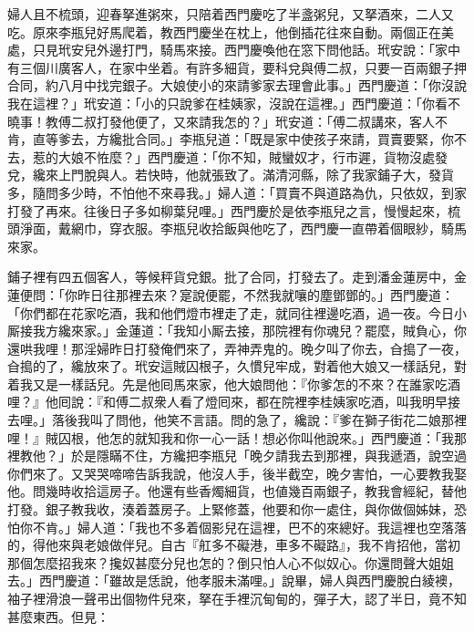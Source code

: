 婦人且不梳頭，迎春拏進粥來，只陪着西門慶吃了半盞粥兒，又拏酒來，二人又吃。原來李瓶兒好馬爬着，教西門慶坐在枕上，他倒插花往來自動。兩個正在美處，只見玳安兒外邊打門，騎馬來接。西門慶喚他在窓下問他話。玳安說：「家中有三個川廣客人，在家中坐着。有許多細貨，要科兌與傅二叔，只要一百兩銀子押合同，約八月中找完銀子。大娘使小的來請爹家去理會此事。」{}西門慶道：「你沒說我在這裡？」玳安道：「小的只說爹在桂姨家，沒說在這裡。」西門慶道：「你看不曉事！教傅二叔打發他便了，又來請我怎的？」玳安道：「傅二叔講來，客人不肯，直等爹去，方纔批合同。」李瓶兒道：「既是家中使孩子來請，買賣要緊，你不去，惹的大娘不恠麼？」西門慶道：「你不知，賊蠻奴才，行市遲，貨物沒處發兌，纔來上門脫與人。{}若快時，他就張致了。滿清河縣，除了我家鋪子大，發貨多，隨問多少時，不怕他不來尋我。」{}婦人道：「買賣不與道路為仇，{}只依奴，到家打發了再來。往後日子多如柳葉兒哩。」西門慶於是依李瓶兒之言，慢慢起來，梳頭淨面，戴網巾，穿衣服。李瓶兒收拾飯與他吃了，西門慶一直帶着個眼紗，騎馬來家。

鋪子裡有四五個客人，等候秤貨兌銀。批了合同，打發去了。走到潘金蓮房中，金蓮便問：「你昨日往那裡去來？寔說便罷，不然我就嚷的塵鄧鄧的。」西門慶道：「你們都在花家吃酒，我和他們燈市裡走了走，就同往裡邊吃酒，過一夜。今日小厮接我方纔來家。」金蓮道：「我知小厮去接，那院裡有你魂兒？罷麼，賊負心，你還哄我哩！那淫婦昨日打發俺們來了，弄神弄鬼的。晚夕叫了你去，㒲搗了一夜，㒲搗的了，纔放來了。{}玳安這賊囚根子，久慣兒牢成，對着他大娘又一樣話兒，對着我又是一樣話兒。先是他囘馬來家，他大娘問他：『你爹怎的不來？在誰家吃酒哩？』他囘說：『和傅二叔衆人看了燈囘來，都在院裡李桂姨家吃酒，叫我明早接去哩。」落後我叫了問他，他笑不言語。問的急了，{}纔說：『爹在獅子街花二娘那裡哩！』賊囚根，他怎的就知我和你一心一話！想必你叫他說來。」西門慶道：「我那裡教他？」於是隱瞞不住，方纔把李瓶兒「晚夕請我去到那裡，與我遞酒，說空過你們來了。又哭哭啼啼告訴我說，他沒人手，後半截空，晚夕害怕，一心要教我娶他。問幾時收拾這房子。他還有些香燭細貨，也値幾百兩銀子，教我會經紀，替他打發。銀子教我收，湊着蓋房子。上緊修蓋，他要和你一處住，與你做個姊妹，恐怕你不肯。」{}婦人道：「我也不多着個影兒在這裡，巴不的來總好。我這裡也空落落的，得他來與老娘做伴兒。自古『舡多不礙港，車多不礙路』，我不肯招他，當初那個怎麼招我來？攙奴甚麼分兒也怎的？倒只怕人心不似奴心。{}{}你還問聲大姐姐去。」西門慶道：「雖故是恁說，他孝服未滿哩。」說畢，婦人與西門慶脫白綾襖，袖子裡滑浪一聲弔出個物件兒來，{}拏在手裡沉甸甸的，彈子大，認了半日，竟不知甚麼東西。但見：

